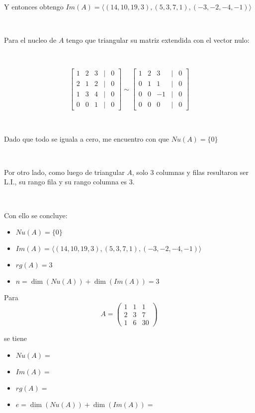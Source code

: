 \documentclass{article}
\begin{document}
\

\noindent Y entonces obtengo $Im(A) = \langle (14,10,19,3),(5,3,7,1),(-3,-2,-4,-1)\rangle$

\

\noindent Para el nucleo de $A$ tengo que triangular su matriz extendida con el vector nulo:

\

\[
\begin{bmatrix}
    1 & 2 & 3 & | & 0 \\
    2 & 1 & 2 & | & 0 \\
    1 & 3 & 4 & | & 0 \\
    0 & 0 & 1 & | & 0
\end{bmatrix}
\sim
\begin{bmatrix}
    1 & 2 & 3 & | & 0 \\
    0 & 1 & 1 & | & 0 \\
    0 & 0 & -1 & | & 0 \\
    0 & 0 & 0 & | & 0
\end{bmatrix}
\]

\

\noindent Dado que todo se iguala a cero, me encuentro con que $Nu(A) = \{0\}$

\

\noindent Por otro lado, como luego de triangular $A$, solo 3 columnas y filas resultaron ser L.I.,
su rango fila y su rango columna es 3.

\

Con ello se concluye:

\begin{itemize}
    \item $Nu(A) = \{0\}$ 
    \item $Im(A) = \langle (14,10,19,3),(5,3,7,1),(-3,-2,-4,-1)\rangle$ 
    \item $rg(A) = 3$
    \item $n = \dim(Nu(A)) + \dim(Im(A)) = 3$  
\end{itemize}

\newpage

\noindent Para \[A = \begin{pmatrix}
    1 & 1 & 1 \\
    2 & 3 & 7 \\
    1 & 6 & 30
\end{pmatrix}\]

\noindent se tiene 

\begin{itemize}
    \item $Nu(A) = $ 
    \item $Im(A) = $ 
    \item $rg(A) = $
    \item $e = \dim(Nu(A)) + \dim(Im(A)) = $  
\end{itemize}
\end{document}

